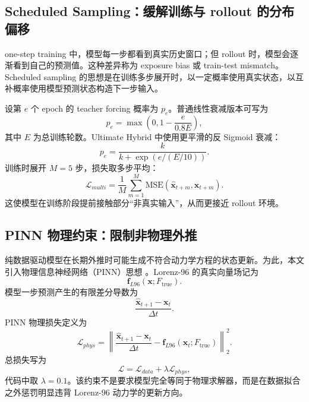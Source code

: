 \documentclass[UTF8,a4paper,12pt]{ctexart}
\newcommand{\xvec}{\mathbf{x}}
\newcommand{\dt}{\Delta t}
\newcommand{\mse}{\mathrm{MSE}}
\begin{document}
\subsection{Scheduled Sampling：缓解训练与 rollout 的分布偏移}

one-step training 中，模型每一步都看到真实历史窗口；但 rollout 时，模型会逐渐看到自己的预测值。这种差异称为 exposure bias 或 train-test mismatch。Scheduled sampling 的思想是在训练多步展开时，以一定概率使用真实状态，以互补概率使用模型预测状态构造下一步输入。

设第 $e$ 个 epoch 的 teacher forcing 概率为 $p_e$。普通线性衰减版本可写为
\begin{equation}
p_e=\max\left(0,1-\frac{e}{0.8E}\right),
\end{equation}
其中 $E$ 为总训练轮数。Ultimate Hybrid 中使用更平滑的反 Sigmoid 衰减：
\begin{equation}
p_e=\frac{k}{k+\exp(e/(E/10))}.
\end{equation}
训练时展开 $M=5$ 步，损失取多步平均：
\begin{equation}
\mathcal{L}_{multi}=\frac{1}{M}\sum_{m=1}^{M}\mse(\hat{\xvec}_{t+m},\xvec_{t+m}).
\end{equation}
这使模型在训练阶段提前接触部分“非真实输入”，从而更接近 rollout 环境。

\subsection{PINN 物理约束：限制非物理外推}

纯数据驱动模型在长期外推时可能生成不符合动力学方程的状态更新。为此，本文引入物理信息神经网络（PINN）思想 \cite{raissi2019}。Lorenz-96 的真实向量场记为
\begin{equation}
\mathbf{f}_{L96}(\xvec;F_{\mathrm{true}}).
\end{equation}
模型一步预测产生的有限差分导数为
\begin{equation}
\frac{\hat{\xvec}_{t+1}-\xvec_t}{\dt}.
\end{equation}
PINN 物理损失定义为
\begin{equation}
\mathcal{L}_{phys}=
\left\|
\frac{\hat{\xvec}_{t+1}-\xvec_t}{\dt}
-
\mathbf{f}_{L96}(\xvec_t;F_{\mathrm{true}})
\right\|_2^2.
\end{equation}
总损失写为
\begin{equation}
\mathcal{L}=\mathcal{L}_{data}+\lambda \mathcal{L}_{phys},
\end{equation}
代码中取 $\lambda=0.1$。该约束不是要求模型完全等同于物理求解器，而是在数据拟合之外惩罚明显违背 Lorenz-96 动力学的更新方向。
\end{document}
